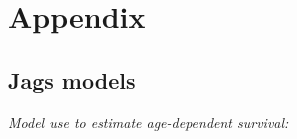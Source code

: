 \documentclass[12pt,a4paper,final,abstract=true,headings=small]{scrartcl}
\begin{document}


\newpage
\singlespacing
\printbibliography

\newpage

\section*{Appendix}

\subsection*{Jags models}

\emph{Model use to estimate age-dependent survival:} \label{app:brood}
\end{document}
